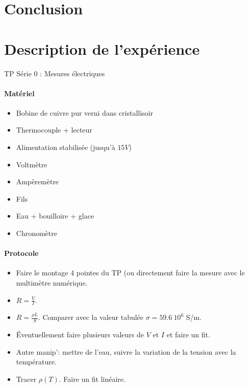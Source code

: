 \documentclass[11pt]{report}
\numberwithin{figure}{section}
\numberwithin{equation}{section}
\numberwithin{table}{section}
\newcommand{\1}{\boldsymbol{1}}
\begin{document}
\section*{Conclusion}


\section*{Description de l'expérience}

\textcolor{mycolor5}{TP Série 0 : Mesures électriques}

\begin{tcolorbox}[breakable, enhanced, colback=red!2!white,colframe=mycolor!85!black,title=\textbf{\textbf{Expérience}}]
\paragraph*{Matériel}
\begin{itemize}
\item Bobine de cuivre pur verni dans cristallisoir
		\item Thermocouple + lecteur
		\item Alimentation stabilisée (jusqu'à $15V$)
		\item Voltmètre
		\item Ampèremètre
		\item Fils
		\item Eau + bouilloire + glace
		\item Chronomètre
\end{itemize}

\paragraph*{Protocole } 

\begin{itemize}[label=$\triangleright$]
		\item Faire le montage $4$ pointes du TP (ou directement faire la mesure avec le multimètre numérique.
		\item $R = \frac{V}{I}$.
		\item $R = \frac{\rho L}{S}$. Comparer avec la valeur tabulée $\sigma = 59.6~10^6$ S/m.
		\item Éventuellement faire plusieurs valeurs de $V$ et $I$ et faire un fit.
		\item Autre manip': mettre de l'eau, suivre la variation de la tension avec la température.
		\item Tracer $\rho(T)$. Faire un fit linéaire.
\end{itemize}


\end{tcolorbox}
\end{document}
